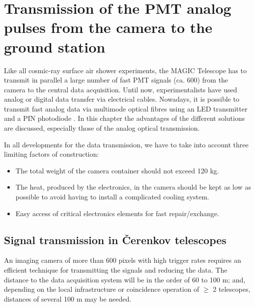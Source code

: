 \section{Transmission of the PMT analog pul\-ses from the camera
to the ground station}


\medskip Like all cosmic-ray surface air shower experiments, the MAGIC Telescope
has to
transmit in parallel a 
large number of fast PMT signals (ca. 600) from the camera to the central
data acquisition. Until now, experimentalists have used analog or digital
data transfer via electrical cables. Nowadays, it is possible to transmit
fast analog data via multimode optical fibres using an LED transmitter and a
PIN photodiode \cite{karle:96}. In this chapter the advantages of the
different solutions are discussed, especially those of the analog optical
transmission.

In all developments for the data transmission, we have to take into account
three limiting factors of construction:

\begin{itemize}
\item  The total weight of the camera container should not exceed 120 kg.

\item  The heat, produced by the electronics, in the camera should be kept
as low as possible to avoid having to install a complicated cooling system.

\item Easy access of critical electronics elements for fast repair/exchange.
\end{itemize}

\subsection{Signal transmission in \v{C}erenkov telescopes}


\medskip An imaging camera of more than 600 pixels with high trigger rates
requires an efficient technique for transmitting the signals and reducing
the data. The distance to the data acquisition system will be in the order
of 60 to 100 m; and, depending on the local infrastructure or coincidence
operation of $\geq$ 2 telescopes, distances of several 100 m may be
needed.

